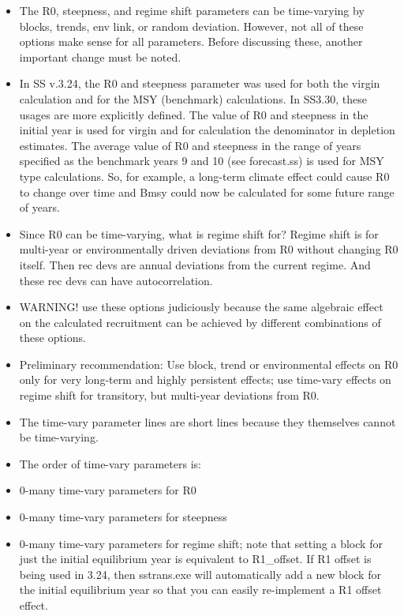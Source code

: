 \begin{itemize}
	\item 	The R0, steepness, and regime shift parameters can be time-varying by blocks, trends, env link, or random deviation.  However, not all of these options make sense for all parameters.  Before discussing these, another important change must be noted.
	\item In SS v.3.24, the R0 and steepness parameter was used for both the virgin calculation and for the MSY (benchmark) calculations.  In SS3.30, these usages are more explicitly defined.  The value of R0 and steepness in the initial year is used for virgin and for calculation the denominator in depletion estimates.  The average value of R0 and steepness in the range of years specified as the benchmark years 9 and 10 (see forecast.ss) is used for MSY type calculations.  So, for example, a long-term climate effect could cause R0 to change over time and Bmsy could now be calculated for some future range of years.
	\item Since R0 can be time-varying, what is regime shift for?  Regime shift is for multi-year or environmentally driven deviations from R0 without changing R0 itself.  Then rec devs are annual deviations from the current regime.  And these rec devs can have autocorrelation.
	\item 	WARNING!  use these options judiciously because the same algebraic effect on the calculated recruitment can be achieved by different combinations of these options.
	\item Preliminary recommendation:  Use block, trend or environmental effects on R0 only for very long-term and highly persistent effects; use time-vary effects on regime shift for transitory, but multi-year deviations from R0.
	\item The time-vary parameter lines are short lines because they themselves cannot be time-varying.
	\item The order of time-vary parameters is:
	\item 0-many time-vary parameters for R0
	\item 0-many time-vary parameters for steepness
	\item 0-many time-vary parameters for regime shift; note that setting a block for just the initial equilibrium year is equivalent to R1\_offset.  If R1 offset is being used in 3.24, then sstrans.exe will automatically add a new block for the initial equilibrium year so that you can easily re-implement a R1 offset effect.
\end{itemize}

